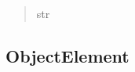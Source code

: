 \documentclass[letterpaper,10pt,english]{sphinxmanual}
\begin{document}
\begin{fulllineitems}
\begin{fulllineitems}
\begin{quote}
\begin{description}
\sphinxAtStartPar
str

\end{description}\end{quote}

\end{fulllineitems}


\end{fulllineitems}



\subsection{ObjectElement}
\label{\detokenize{code_documentation:objectelement}}
\end{document}
